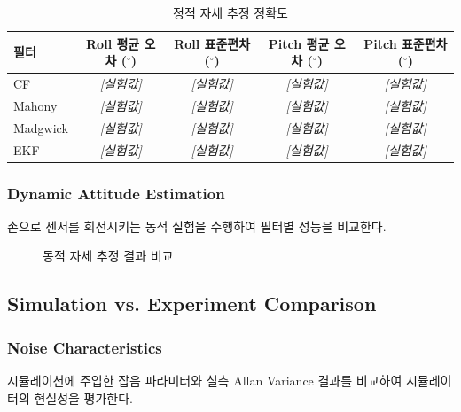             \begin{table}[H]
                \centering
                \caption{정적 자세 추정 정확도}
                \label{tab:static_attitude}
                \begin{tabular}{lcccc}
                    \toprule
                    필터 & Roll 평균 오차 ($^\circ$) & Roll 표준편차 ($^\circ$) & Pitch 평균 오차 ($^\circ$) & Pitch 표준편차 ($^\circ$) \\
                    \midrule
                    CF       & \textit{[실험값]} & \textit{[실험값]} & \textit{[실험값]} & \textit{[실험값]} \\
                    Mahony   & \textit{[실험값]} & \textit{[실험값]} & \textit{[실험값]} & \textit{[실험값]} \\
                    Madgwick & \textit{[실험값]} & \textit{[실험값]} & \textit{[실험값]} & \textit{[실험값]} \\
                    EKF      & \textit{[실험값]} & \textit{[실험값]} & \textit{[실험값]} & \textit{[실험값]} \\
                    \bottomrule
                \end{tabular}
            \end{table}

        \subsubsection{Dynamic Attitude Estimation}
            손으로 센서를 회전시키는 동적 실험을 수행하여 필터별 성능을 비교한다.\\

            \begin{figure}[H]
                \centering
                \caption{동적 자세 추정 결과 비교}
                \label{fig:dynamic_attitude}
            \end{figure}

    \subsection{Simulation vs. Experiment Comparison}
        \subsubsection{Noise Characteristics}
            시뮬레이션에 주입한 잡음 파라미터와 실측 Allan Variance 결과를 비교하여 시뮬레이터의 현실성을 평가한다.\\

